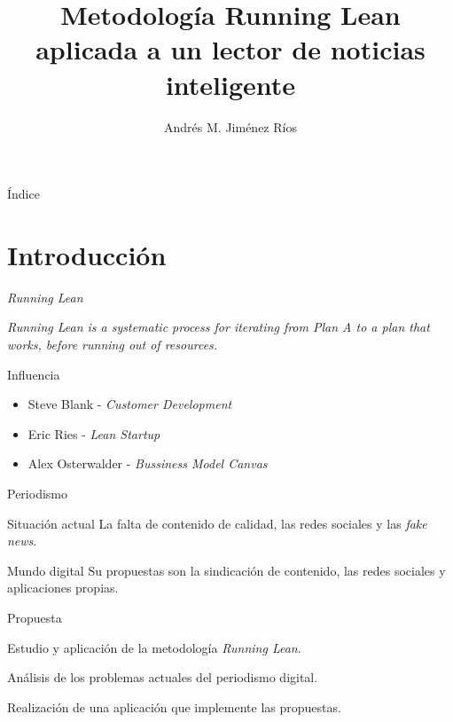 \documentclass[12pt]{beamer}
\title{Metodología Running Lean aplicada a un lector de noticias inteligente}
\author{Andrés M. Jiménez Ríos}
\institute[TFM]{Trabajo Fin de Máster}
\begin{document}
	\frame{\titlepage}
	
	\begin{frame}{Índice}
		\tableofcontents
	\end{frame}

	\section{Introducción}	
		\begin{frame}{\textit{Running Lean}}
			\begin{block}{}
				\textit{Running Lean is a systematic process for iterating from Plan A to a plan that works, before running out of resources.}
			\end{block}
			\begin{block}{Influencia}
				\begin{itemize}
                    \item Steve Blank - \textit{Customer Development}
                    \item Eric Ries - \textit{Lean Startup}
                    \item Alex Osterwalder - \textit{Bussiness Model Canvas}
                \end{itemize}
			\end{block}
        \end{frame}
	
		\begin{frame}{Periodismo}
			\begin{block}{Situación actual}
				La falta de contenido de calidad, las redes sociales y las \textit{fake news}.
			\end{block}
			\begin{block}{Mundo digital}
				Su propuestas son la sindicación de contenido, las redes sociales y aplicaciones propias.
			\end{block}
		\end{frame}

		\begin{frame}{Propuesta}
			\begin{block}{}
				Estudio y aplicación de la metodología \textit{Running Lean}.
			\end{block}
			\begin{block}{}
				Análisis de los problemas actuales del periodismo digital.
			\end{block}
			\begin{block}{}
				Realización de una aplicación que implemente las propuestas.
			\end{block}
		\end{frame}
\end{document}
